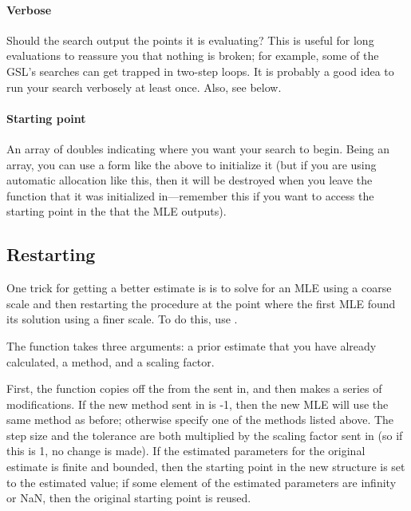 \paragraph{Verbose} Should the search output the points it is evaluating?
This is useful for long evaluations to reassure you that nothing is
broken; for example, some of the GSL's searches can get trapped in two-step loops.
It is probably a good idea to run your search verbosely at least once.
Also, see  below.

\paragraph{Starting point} An array of doubles indicating where you want
your search to begin. Being an array, you can use a form like the above
to initialize it (but if you are using automatic allocation like this, then it will be destroyed when you leave the
function that it was initialized in---remember this if you want to
access the starting point in the  that the MLE outputs).


\subsection{Restarting} 
\label{restart} One trick for getting a better estimate is is to solve
for an MLE using a coarse scale and then restarting the procedure at
the point where the first MLE found its solution using a finer scale.
To do this, use .

The function takes three arguments: a prior estimate that you have
already calculated, a method, and a scaling factor. 

First, the function copies off the 
from the  sent in, and then makes a series of
modifications.  If the new method sent in is -1, then the new MLE will
use the same method as before; otherwise specify one of the methods
listed above. The step size and the tolerance are both multiplied by the
scaling factor sent in (so if this is 1, no change is made). If the
estimated parameters for the original estimate is finite and bounded, then 
the starting point in the new 
structure is set to the estimated value; if some element of the
estimated parameters are infinity or NaN, then the original starting
point is reused.

